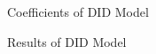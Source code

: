 \documentclass[
  12pt]{article}
\begin{document}
\begin{figure}


\caption{\label{fig-did}Coefficients of DID Model}

\end{figure}%

\begin{figure}


\caption{\label{fig-DID_table}Results of DID Model}

\end{figure}%
\end{document}
